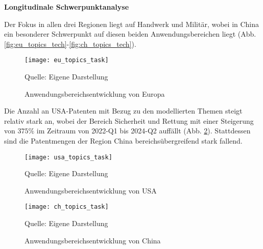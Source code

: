 \textbf{Longitudinale Schwerpunktanalyse}

Der Fokus in allen drei Regionen liegt auf Handwerk und Militär, wobei in China ein besonderer Schwerpunkt auf diesen beiden Anwendungsbereichen liegt (Abb. \ref{fig:eu_topics_tech}-\ref{fig:ch_topics_tech}).
\begin{figure}[!h]
	\caption{Anwendungsbereichsentwicklung von Europa}
	\texttt{[image: eu\_topics\_task]}
	\label{fig:eu_topics_task}
	\vspace{0.5em}
	\raggedright
	\normalsize{Quelle: Eigene Darstellung}
\end{figure}
Die Anzahl an USA-Patenten mit Bezug zu den modellierten Themen steigt relativ stark an, wobei der Bereich Sicherheit und Rettung mit einer Steigerung von $375\%$ im Zeitraum von 2022-Q1 bis 2024-Q2 auffällt (Abb. \ref{fig:usa_topics_task}). Stattdessen sind die Patentmengen der Region China bereichsübergreifend stark fallend.
\begin{figure}[h]
	\caption{Anwendungsbereichsentwicklung von USA}
	\texttt{[image: usa\_topics\_task]}
	\label{fig:usa_topics_task}
		\vspace{0.5em}
	\raggedright
	\normalsize{Quelle: Eigene Darstellung}
	\vspace{-0.5em}
\end{figure}
\begin{figure}[H]
	\caption{Anwendungsbereichsentwicklung von China}
	\texttt{[image: ch\_topics\_task]}
	\label{fig:ch_topics_task}
		\vspace{0.5em}
	\raggedright
	\normalsize{Quelle: Eigene Darstellung}
\end{figure}

